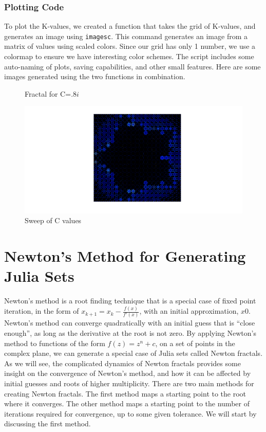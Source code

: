 \documentclass[12pt]{article}
\begin{document}
\begin{onehalfspace}
\subsubsection*{Plotting Code}	
To plot the K-values, we created a function that takes the grid of K-values, and generates an image using \verb|imagesc|. This command generates an image from a matrix of values using scaled colors. Since our grid has only 1 number, we use a colormap to ensure we have interesting color schemes. The script includes some auto-naming of plots, saving capabilities, and other small features. Here are some images generated using the two functions in combination.
\begin{figure}[H]
	\centering
	\caption{Fractal for C=$.8i$}
	\label{fig:}
\end{figure}
\begin{figure}[H]
\centering
\includegraphics[width=.7\linewidth]{"images/sweep1"}
\caption{Sweep of C values}
\label{fig:untitled3}
\end{figure}
\section*{Newton’s Method for Generating Julia Sets}
Newton’s method is a root finding technique that is a special case of fixed point iteration, in the form of  $x_{k+1}=x_k - \frac{f(x)}{f'(x)}$,  with an initial approximation, $x0$.  Newton’s method can converge quadratically with an initial guess that is “close enough”, as long as the derivative at the root is not zero.  By applying Newton’s method to functions of the form $f(z) = z^n + c$,  on a set of points in the complex plane, we can generate a special case of Julia sets called Newton fractals.  As we will see, the complicated dynamics of Newton fractals provides some insight on the convergence of Newton’s method, and how it can be affected by initial guesses and roots of higher multiplicity.  There  are two main methods for creating Newton fractals.  The first method maps a starting point to the root where it converges.  The other method maps a starting point to the number of iterations required for convergence, up to some given tolerance.   We will start by discussing the first method.

\end{onehalfspace}
\end{document}
